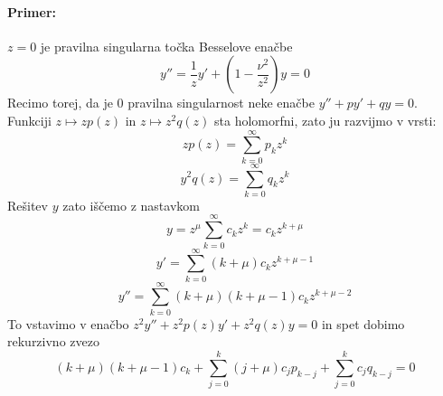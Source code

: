 \documentclass[a4paper]{article}
\newcommand{\Sum}[2][0]{\sum_{{#2} = {#1}}^{\infty}}
\begin{document}
\paragraph{Primer:} $z=0$ je pravilna singularna točka Besselove enačbe
$$y'' = \frac{1}{z}y' + \left(1 - \frac{\nu^2}{z^2}\right)y = 0$$
Recimo torej, da je 0 pravilna singularnost neke enačbe $y'' + py' + qy = 0$.
Funkciji $z \mapsto zp(z)$ in $z \mapsto z^2q(z)$ sta holomorfni, zato ju razvijmo v vrsti:
$$zp(z) = \Sum{k} p_kz^k$$
$$y^2q(z) = \Sum{k} q_kz^k$$
Rešitev $y$ zato iščemo z nastavkom $$y = z^\mu\Sum{k}c_kz^k = c_kz^{k+\mu}$$
$$y' = \Sum{k}(k+\mu)c_kz^{k+\mu-1}$$
$$y'' = \Sum{k}(k+\mu)(k + \mu - 1)c_kz^{k+\mu-2}$$
To vstavimo v enačbo $z^2y'' + z^2p(z)y' + z^2q(z)y = 0$ in spet dobimo rekurzivno zvezo
$$(k+\mu)(k+\mu-1)c_k + \sum_{j=0}^{k}(j + \mu)c_jp_{k-j} + \sum_{j=0}^{k}c_jq_{k-j} = 0$$
\end{document}
